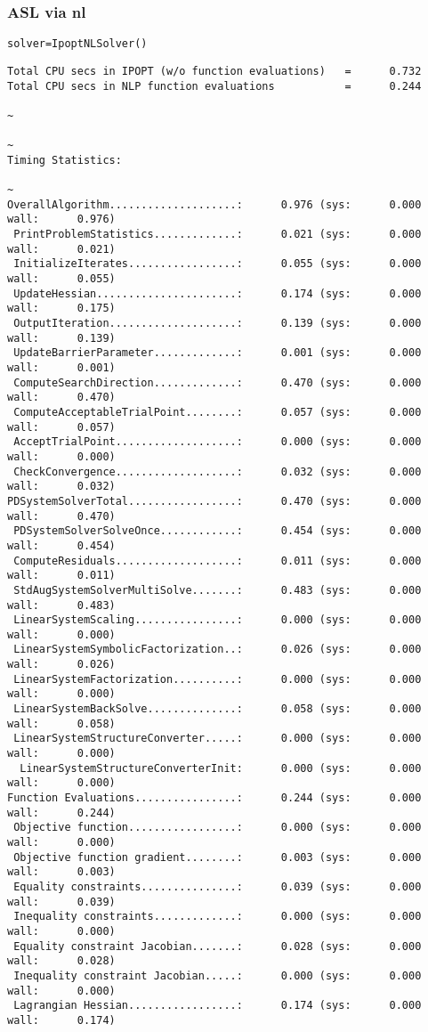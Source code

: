 \documentclass[compressed,dvips,letter]{beamer}
\begin{document}
\begin{frame}[fragile]\frametitle{ASL via nl}
{\footnotesize \texttt{solver=IpoptNLSolver()}}
{\fontsize{6pt}{0} \selectfont
\begin{verbatim}
Total CPU secs in IPOPT (w/o function evaluations)   =      0.732
Total CPU secs in NLP function evaluations           =      0.244
                                                                                                       ~
                                                                                                       ~
Timing Statistics:
                                                                                                       ~
OverallAlgorithm....................:      0.976 (sys:      0.000 wall:      0.976)
 PrintProblemStatistics.............:      0.021 (sys:      0.000 wall:      0.021)
 InitializeIterates.................:      0.055 (sys:      0.000 wall:      0.055)
 UpdateHessian......................:      0.174 (sys:      0.000 wall:      0.175)
 OutputIteration....................:      0.139 (sys:      0.000 wall:      0.139)
 UpdateBarrierParameter.............:      0.001 (sys:      0.000 wall:      0.001)
 ComputeSearchDirection.............:      0.470 (sys:      0.000 wall:      0.470)
 ComputeAcceptableTrialPoint........:      0.057 (sys:      0.000 wall:      0.057)
 AcceptTrialPoint...................:      0.000 (sys:      0.000 wall:      0.000)
 CheckConvergence...................:      0.032 (sys:      0.000 wall:      0.032)
PDSystemSolverTotal.................:      0.470 (sys:      0.000 wall:      0.470)
 PDSystemSolverSolveOnce............:      0.454 (sys:      0.000 wall:      0.454)
 ComputeResiduals...................:      0.011 (sys:      0.000 wall:      0.011)
 StdAugSystemSolverMultiSolve.......:      0.483 (sys:      0.000 wall:      0.483)
 LinearSystemScaling................:      0.000 (sys:      0.000 wall:      0.000)
 LinearSystemSymbolicFactorization..:      0.026 (sys:      0.000 wall:      0.026)
 LinearSystemFactorization..........:      0.000 (sys:      0.000 wall:      0.000)
 LinearSystemBackSolve..............:      0.058 (sys:      0.000 wall:      0.058)
 LinearSystemStructureConverter.....:      0.000 (sys:      0.000 wall:      0.000)
  LinearSystemStructureConverterInit:      0.000 (sys:      0.000 wall:      0.000)
Function Evaluations................:      0.244 (sys:      0.000 wall:      0.244)
 Objective function.................:      0.000 (sys:      0.000 wall:      0.000)
 Objective function gradient........:      0.003 (sys:      0.000 wall:      0.003)
 Equality constraints...............:      0.039 (sys:      0.000 wall:      0.039)
 Inequality constraints.............:      0.000 (sys:      0.000 wall:      0.000)
 Equality constraint Jacobian.......:      0.028 (sys:      0.000 wall:      0.028)
 Inequality constraint Jacobian.....:      0.000 (sys:      0.000 wall:      0.000)
 Lagrangian Hessian.................:      0.174 (sys:      0.000 wall:      0.174)
\end{verbatim}
}
\end{frame}
%
%
\end{document}
